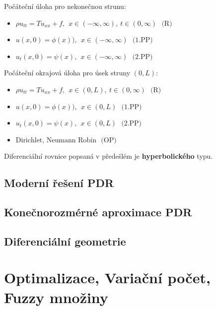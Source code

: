 \documentclass[a4]{report}
\theoremstyle{definition}
\begin{document}
 Počáteční úloha pro nekonečnou strunu:
 \begin{itemize}
 \item $\rho u_{tt}=Tu_{xx}+f, \ \ x\in(-\infty,\infty), \ t\in(0,\infty) \ \ \ \textrm{(R)}$
 \item $u(x,0)=\phi(x)), \ \ x\in(-\infty,\infty) \ \ \ \textrm{(1.PP)}$
 \item $u_t (x,0)=\psi(x), \ \ x\in(-\infty,\infty)  \ \ \ \textrm{(2.PP)}$
 \end{itemize}
 
 Počáteční okrajová úloha pro úsek struny $(0,L)$:
 \begin{itemize}
 \item $ \rho u_{tt}=Tu_{xx}+f, \ \ x\in(0,L),\ t\in(0,\infty)  \ \ \ \textrm{(R)}$
 \item  $ u(x,0)=\phi(x)), \ \ x\in(0,L) \ \ \ \textrm{(1.PP)}$
 \item  $ u_t (x,0)=\psi(x), \ \ x\in(0,L)  \ \ \ \textrm{(2.PP)}$
 \item $\textrm{Dirichlet, Neumann Robin} \ \ \ \textrm{(OP)} $
 \end{itemize}
 
 Diferenciální rovnice popsaná v předešlém je \textbf{hyperbolického} typu.



\section{Moderní řešení PDR}

\section{Konečnorozmérné aproximace PDR}

\section{Diferenciální geometrie}

\chapter{Optimalizace, Variační počet, Fuzzy množiny}
\end{document}

